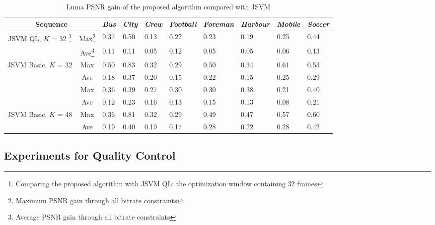 \documentclass[journal,draftclsnofoot,onecolumn]{IEEEtran}
\begin{document}
\begin{table}[t]
\centering
\caption{Luma PSNR gain of the proposed algorithm compared with JSVM}
\label{tab:extraction-gain}
\begin{minipage}{0.95\linewidth}
\centering
\begin{tabular}{c|c|p{1.2cm}<{\centering}|p{1.2cm}<{\centering}|p{1.2cm}<{\centering}|p{1.2cm}<{\centering}| 
p{1.2cm}<{\centering}|p{1.2cm}<{\centering}|p{1.2cm}<{\centering}|p{1.2cm}<{\centering}}
\hline \hline
\multicolumn{2}{c|}{Sequence} &
{\em Bus} & {\em City} & {\em Crew} & {\em Football} & {\em Foreman} & {\em Harbour} & {\em Mobile} & {\em Soccer} \\ \hline 
\multirow{2}{*}{JSVM QL, $K$ = 32 \footnote{\label{footnote:JSVM_QL} Comparing the proposed algorithm with JSVM QL; the optimization window containing 32 frames}}
& Max\footnote{\label{footnote:max} Maximum PSNR gain through all bitrate constraints}
& 0.37 & 0.50 & 0.13 & 0.22 & 0.23 & 0.19 & 0.25 & 0.44 \\ \cline{2-10}
& Ave\footnote{\label{footnote:ave} Average PSNR gain through all bitrate constraints}
& 0.11 & 0.11 & 0.05 & 0.12 & 0.05 & 0.05 & 0.06 & 0.13 \\ \hline
\multirow{2}{*}{JSVM Basic, $K$ = 32}
& Max & 0.50 & 0.83 & 0.32 & 0.29 & 0.50 & 0.34 & 0.61 & 0.53 \\ \cline{2-10}
& Ave & 0.18 & 0.37 & 0.20 & 0.15 & 0.22 & 0.15 & 0.25 & 0.29 \\ \Xhline{2\arrayrulewidth}
\multirow{2}{*}{JSVM QL, $K$ = 48}
& Max & 0.36 & 0.39 & 0.27 & 0.30 & 0.30 & 0.38 & 0.21 & 0.40 \\ \cline{2-10}
& Ave & 0.12 & 0.23 & 0.16 & 0.13 & 0.15 & 0.13 & 0.08 & 0.21 \\ \hline
\multirow{2}{*}{JSVM Basic, $K$ = 48}
& Max & 0.36 & 0.81 & 0.32 & 0.29 & 0.49 & 0.47 & 0.57 & 0.60 \\ \cline{2-10}
& Ave & 0.19 & 0.40 & 0.19 & 0.17 & 0.28 & 0.22 & 0.28 & 0.42 \\ \hline
\end{tabular}
\end{minipage}
\end{table}

\subsection{Experiments for Quality Control}
\label{subsec:exp-control}
\end{document}
